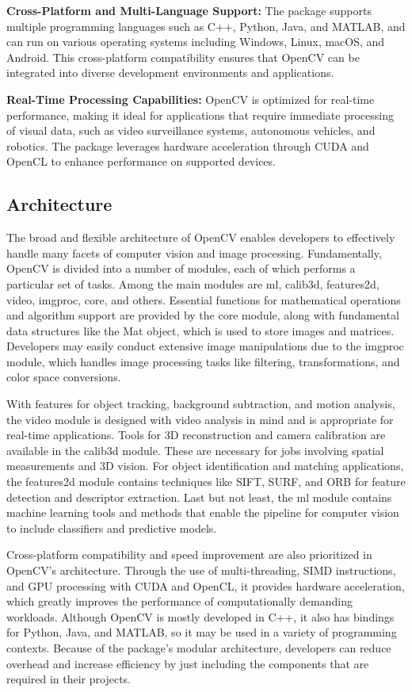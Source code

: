 \textbf{Cross-Platform and Multi-Language Support:} The package supports multiple programming languages such as C++, Python, Java, and MATLAB, and can run on various operating systems including Windows, Linux, macOS, and Android. This cross-platform compatibility ensures that OpenCV can be integrated into diverse development environments and applications.

\textbf{Real-Time Processing Capabilities:} OpenCV is optimized for real-time performance, making it ideal for applications that require immediate processing of visual data, such as video surveillance systems, autonomous vehicles, and robotics. The package leverages hardware acceleration through CUDA and OpenCL to enhance performance on supported devices.\cite{OpenCVTeam:2023,OpenCVTeam:2024b}

\subsection{Architecture}

The broad and flexible architecture of OpenCV enables developers to effectively handle many facets of computer vision and image processing. Fundamentally, OpenCV is divided into a number of modules, each of which performs a particular set of tasks. Among the main modules are ml, calib3d, features2d, video, imgproc, core, and others. Essential functions for mathematical operations and algorithm support are provided by the core module, along with fundamental data structures like the Mat object, which is used to store images and matrices. Developers may easily conduct extensive image manipulations due to the imgproc module, which handles image processing tasks like filtering, transformations, and color space conversions.

With features for object tracking, background subtraction, and motion analysis, the video module is designed with video analysis in mind and is appropriate for real-time applications. Tools for 3D reconstruction and camera calibration are available in the calib3d module. These are necessary for jobs involving spatial measurements and 3D vision. For object identification and matching applications, the features2d module contains techniques like SIFT, SURF, and ORB for feature detection and descriptor extraction. Last but not least, the ml module contains machine learning tools and methods that enable the pipeline for computer vision to include classifiers and predictive models.\cite{OpenCVTeam:2024}

Cross-platform compatibility and speed improvement are also prioritized in OpenCV's architecture. Through the use of multi-threading, SIMD instructions, and GPU processing with CUDA and OpenCL, it provides hardware acceleration, which greatly improves the performance of computationally demanding workloads. Although OpenCV is mostly developed in C++, it also has bindings for Python, Java, and MATLAB, so it may be used in a variety of programming contexts. Because of the package's modular architecture, developers can reduce overhead and increase efficiency by just including the components that are required in their projects.\cite{OpenCVTeam:2024}

